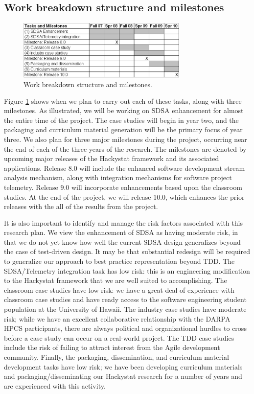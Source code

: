 \subsection{Work breakdown structure and milestones}

\begin{figure}[ht]
  \centering
  \includegraphics[width=0.75\textwidth]{workstructure.eps}
  \caption{Work breakdown structure and milestones.} 
  \label{fig:wbs}
\end{figure}


Figure \ref{fig:wbs} shows when we plan to carry out each of these
tasks, along with three milestones.  As illustrated, we will be
working on SDSA enhancement for almost the entire time of the project.  The case studies 
will begin in year two, and the packaging and curriculum material generation will be the primary
focus of year three. We also plan for three major
milestones during the project, occurring near the end of each of the three
years of the research. The milestones are denoted by upcoming major
releases of the Hackystat framework and its associated applications.
Release 8.0 will include the enhanced software development stream analysis
mechanism, along with integration mechanisms for software project
telemetry.  Release 9.0 will incorporate enhancements based upon the classroom studies. 
At the end of the project, we will release 10.0, which enhances the prior
releases with the all of the results from the project. 

It is also important to identify and manage the risk factors associated
with this research plan.  We view the enhancement of SDSA as having
moderate risk, in that we do not yet know how well the current SDSA design
generalizes beyond the case of test-driven design.  It may be that
substantial redesign will be required to generalize our approach to best
practice representation beyond TDD.  The SDSA/Telemetry integration task
has low risk: this is an engineering modification to the Hackystat
framework that we are well suited to accomplishing.  The classroom case
studies have low risk: we have a great deal of experience with classroom
case studies and have ready access to the software engineering student
population at the University of Hawaii.  The industry case studies have
moderate risk; while we have an excellent collaborative relationship with
the DARPA HPCS participants, there are always political and organizational hurdles to
cross before a case study can occur on a real-world project.  The TDD case
studies include the risk of failing to attract interest from the Agile
development community.  Finally, the packaging, dissemination, and
curriculum material development tasks have low risk; we have been
developing curriculum materials and packaging/disseminating our Hackystat
research for a number of years and are experienced with this activity.

